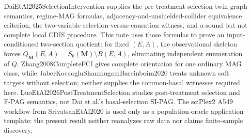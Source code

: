 DaiEtAl2025SelectionIntervention supplies the pre-treatment-selection twin-graph semantics, regime-MAG formulas, adjacency-and-unshielded-collider equivalence criterion, the two-variable selection-versus-causation witness, and a sound but not complete local CDIS procedure.  This note uses those formulas to prove an input-conditioned two-section quotient: for fixed \((E,A)\), the observational skeleton forces \(Q_{\mathbf M}(E,A)=S_0(\mathbf M)\setminus B(E,A)\), eliminating independent enumeration of \(Q\).  Zhang2008CompleteFCI gives complete orientation for one ordinary MAG class, while JaberKocaogluShanmugamBareinboim2020 treats unknown soft targets without selection; neither supplies the common-basal witnesses required here.  LuoEtAl2026PostTreatmentSelection studies post-treatment selection and F-PAG semantics, not Dai et al.'s basal-selection SI-PAG.  The sciPlex2 A549 workflow from SrivatsanEtAl2020 is used only as a population-oracle application template: the present result neither reanalyzes raw data nor claims finite-sample discovery.